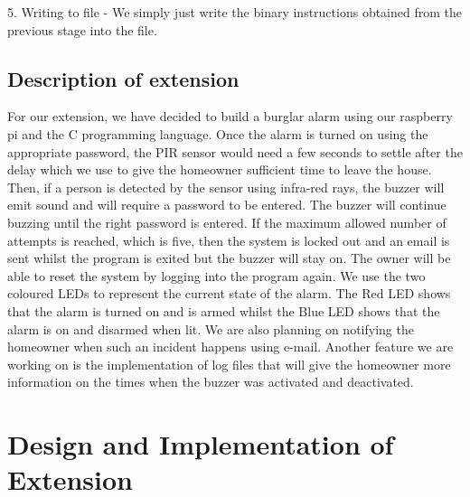 \documentclass[11pt]{article}
\begin{document}
5. Writing to file - We simply just write the binary instructions obtained from the previous stage into the file.

\subsection{Description of extension}
For our extension, we have decided to build a burglar alarm using our raspberry pi and the C programming language.  Once the alarm is turned on using the appropriate password, the PIR sensor would need a few seconds to settle after the delay which we use to give the homeowner sufficient time to leave the house. Then, if a person is detected by the sensor using infra-red rays, the buzzer will emit sound and will require a password to be entered. The buzzer will continue buzzing until the right password is entered. If the maximum allowed number of attempts is reached, which is five, then the system is locked out and an email is sent whilst the program is exited but the buzzer will stay on. The owner will be able to reset the system by logging into the program again. We use the two coloured LEDs to represent the current state of the alarm. The Red LED shows that the alarm is turned on and is armed whilst the Blue LED shows that the alarm is on and disarmed when lit. We are also planning on notifying the homeowner when such an incident happens using e-mail. Another feature we are working on is the implementation of log files that will give the homeowner more information on the times when the buzzer was activated and deactivated.

\section{Design and Implementation of Extension}
\end{document}

